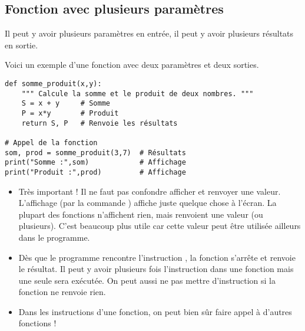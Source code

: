 \documentclass[11pt,class=report,crop=false]{standalone}
\begin{document}


\subsection{Fonction avec plusieurs paramètres}

Il peut y avoir plusieurs paramètres en entrée, il peut y avoir plusieurs résultats en sortie.
  


Voici un exemple d'une fonction avec deux paramètres et deux sorties.
\begin{lstlisting}
def somme_produit(x,y):
    """ Calcule la somme et le produit de deux nombres. """
    S = x + y     # Somme
    P = x*y       # Produit
    return S, P   # Renvoie les résultats

# Appel de la fonction
som, prod = somme_produit(3,7)  # Résultats
print("Somme :",som)            # Affichage
print("Produit :",prod)         # Affichage
\end{lstlisting}

\begin{itemize}
  \item Très important ! Il ne faut pas confondre afficher et renvoyer une valeur.
  L'affichage (par la commande ) affiche juste quelque chose à l'écran. La plupart des fonctions n'affichent rien, mais renvoient une valeur (ou plusieurs). C'est beaucoup plus utile car cette valeur peut être utilisée ailleurs dans le programme.

  
  \item Dès que le programme rencontre l'instruction , la fonction s'arrête et renvoie le résultat. Il peut y avoir plusieurs fois l'instruction  dans une fonction mais une seule sera exécutée. On peut aussi ne pas mettre d'instruction  si la fonction ne renvoie rien.
  
  \item Dans les instructions d'une fonction, on peut bien sûr faire appel à d'autres fonctions !
   
\end{itemize}
\end{document}
